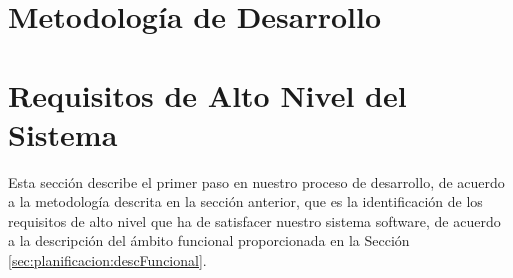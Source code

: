 \section{Metodología de Desarrollo}
\label{sec:planificacion:metodologia}


\section{Requisitos de Alto Nivel del Sistema}
\label{sec:planificacion:requisitos}

Esta sección describe el primer paso en nuestro proceso de desarrollo, de acuerdo a la metodología descrita en la sección anterior, que es la identificación de los requisitos de alto nivel que ha de satisfacer nuestro sistema software, de acuerdo a la descripción del ámbito funcional proporcionada en la Sección~ \ref{sec:planificacion:descFuncional}.

%
%
%
%
%
%
%

